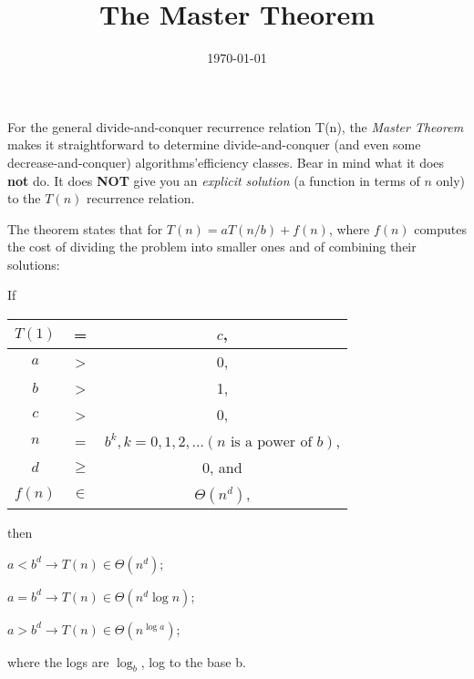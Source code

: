 \documentclass[12pt]{amsart}
\title{The Master Theorem}
\date{\today}
\begin{document}
 For the general divide-and-conquer recurrence relation T(n), the \textit{Master Theorem} makes it straightforward to determine divide-and-conquer (and
  even some decrease-and-conquer) algorithms\textquoteright efficiency classes. Bear in mind what it does \textbf{not} do. It does \textbf{NOT} give you an \textit{explicit solution} (a function in terms of $n$ only) to the $T(n)$ recurrence relation.

  The theorem states that for $T(n) = aT(n/b) + f(n)$, where $f(n)$ computes the
  cost of dividing the problem into smaller ones and of combining their
  solutions:

  If
  
\begin{tabular}{|c|c|c|}
\hline
$T(1)$ & = & $c$,\\
\hline
$a$ & > & 0,\\
\hline
$b$ & > & 1,\\
\hline
$c$ & > & 0,\\
\hline
$n$ & = & $b^k, k = 0, 1, 2, \dots (n \text{ is a power of } b)$,\\
\hline
$d$ & $\ge$ & 0, and\\
\hline
$f(n)$ & $\in$ & $\Theta(n^d)$,\\
\hline
\end{tabular}

  then

  $a < b^d \rightarrow T(n) \in \Theta(n^d)$;

  $a = b^d \rightarrow T(n) \in \Theta(n^d \log n)$;

  $a > b^d \rightarrow T(n) \in \Theta(n^{\log a})$;

  where the logs are $\log_b$, log to the base b.
  
\end{document}
